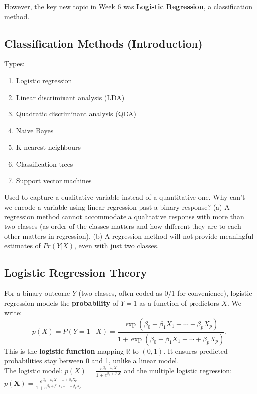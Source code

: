 \documentclass[11pt]{article}
\begin{document}
However, the key new topic in Week 6 was \textbf{Logistic Regression}, a classification method.

\subsection{Classification Methods (Introduction)}
Types:
\begin{enumerate}
    \item Logistic regression
    \item Linear discriminant analysis (LDA)
    \item Quadratic discriminant analysis (QDA)
    \item Naive Bayes
    \item K-nearest neighbours
    \item Classification trees
    \item Support vector machines
\end{enumerate}
\vspace{1em} \noindent Used to capture a qualitative variable instead of a quantitative one. Why can't we encode a variable using linear regression past a binary response? (a) A regression method cannot accommodate a qualitative response with more than two classes (as order of the classes matters and how different they are to each other matters in regression), (b) A regression method will not provide meaningful estimates of $Pr(Y|X)$, even with just two classes.


\subsection{Logistic Regression Theory}
For a binary outcome $Y$ (two classes, often coded as 0/1 for convenience), logistic regression models the \textbf{probability} of $Y=1$ as a function of predictors $X$. We write:
\[ p(X) = P(Y=1 \mid X) = \frac{\exp(\beta_0 + \beta_1 X_1 + \cdots + \beta_p X_p)}{1 + \exp(\beta_0 + \beta_1 X_1 + \cdots + \beta_p X_p)}. \]
This is the \textbf{logistic function} mapping $\mathbb{R}$ to $(0,1)$. It ensures predicted probabilities stay between 0 and 1, unlike a linear model. \\

\noindent The logistic model: $p(X) = \frac{e^{\beta_{0}  + \beta_{1}X}}{1 + e^{\beta_{0} + \beta_{1}X}}$ and the multiple logistic regression: $p(\boldsymbol{X}) = \frac{e^{\beta_{0} + \beta_{1}X_{1} + ... + \beta_{p}X_{p}}}{1 + e^{\beta_{0} + \beta_{1}X_{1} + ... + \beta_{p}X_{p}}}$ \\
\end{document}

